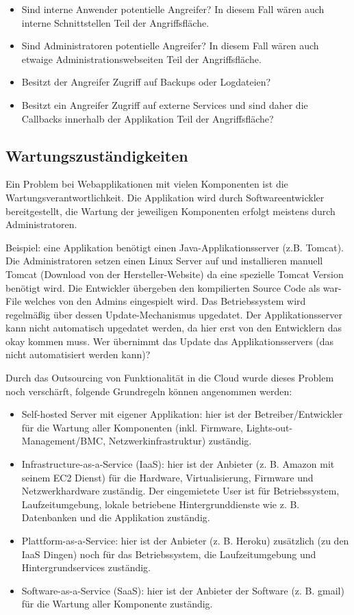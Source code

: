 \begin{itemize}
	\item Sind interne Anwender potentielle Angreifer? In diesem Fall wären auch interne Schnittstellen Teil der Angriffsfläche.
	\item Sind Administratoren potentielle Angreifer? In diesem Fall wären auch etwaige Administrationswebseiten Teil der Angriffsfläche.
	\item Besitzt der Angreifer Zugriff auf Backups oder Logdateien?
	\item Besitzt ein Angreifer Zugriff auf externe Services und sind daher die Callbacks innerhalb der Applikation Teil der Angriffsfläche?
\end{itemize}

\subsection{Wartungszuständigkeiten}

Ein Problem bei Webapplikationen mit vielen Komponenten ist die Wartungsverantwortlichkeit. Die Applikation wird durch Softwareentwickler bereitgestellt, die Wartung der jeweiligen Komponenten erfolgt meistens durch Administratoren.

Beispiel: eine Applikation benötigt einen Java-Applikationsserver (z.B. Tomcat). Die Administratoren setzen einen Linux Server auf und installieren manuell Tomcat (Download von der Hersteller-Website) da eine spezielle Tomcat Version benötigt wird. Die Entwickler übergeben den kompilierten Source Code als war-File welches von den Admins eingespielt wird. Das Betriebssystem wird regelmäßig über dessen Update-Mechanismus upgedatet. Der Applikationsserver kann nicht automatisch upgedatet werden, da hier erst von den Entwicklern das okay kommen muss. Wer übernimmt das Update das Applikationsservers (das nicht automatisiert werden kann)?

Durch das Outsourcing von Funktionalität in die Cloud wurde dieses Problem noch verschärft, folgende Grundregeln können angenommen werden:

\begin{itemize}
	\item Self-hosted Server mit eigener Applikation: hier ist der Betreiber/Entwickler für die Wartung aller Komponenten (inkl. Firmware, Lights-out-Management/BMC, Netzwerkinfrastruktur) zuständig.
	\item Infrastructure-as-a-Service (IaaS): hier ist der Anbieter (z. B. Amazon mit seinem EC2 Dienst) für die Hardware, Virtualisierung, Firmware und Netzwerkhardware zuständig. Der eingemietete User ist für Betriebssystem, Laufzeitumgebung, lokale betriebene Hintergrunddienste wie z. B. Datenbanken und die Applikation zuständig.
	\item Plattform-as-a-Service: hier ist der Anbieter (z. B. Heroku) zusätzlich (zu den IaaS Dingen) noch für das Betriebssystem, die Laufzeitumgebung und Hintergrundservices zuständig.
	\item Software-as-a-Service (SaaS): hier ist der Anbieter der Software (z. B. gmail) für die Wartung aller Komponente zuständig.
\end{itemize}


